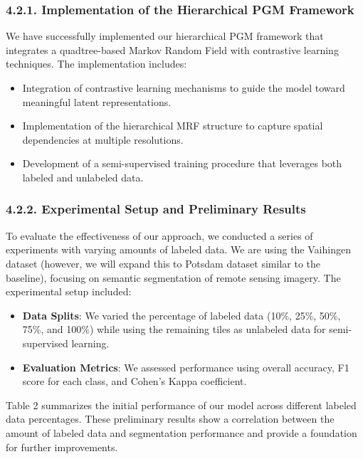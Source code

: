 \documentclass[conference]{IEEEtran}
\begin{document}
\subsubsection*{4.2.1. Implementation of the Hierarchical PGM Framework}

We have successfully implemented our hierarchical PGM framework that integrates a quadtree-based Markov Random Field with contrastive learning techniques. The implementation includes:

\begin{itemize}
    \item Integration of contrastive learning mechanisms to guide the model toward meaningful latent representations.
    \item Implementation of the hierarchical MRF structure to capture spatial dependencies at multiple resolutions.
    \item Development of a semi-supervised training procedure that leverages both labeled and unlabeled data.\\
\end{itemize}

\subsubsection*{4.2.2. Experimental Setup and Preliminary Results}

To evaluate the effectiveness of our approach, we conducted a series of experiments with varying amounts of labeled data. We are using the Vaihingen dataset (however, we will expand this to Potsdam dataset similar to the baseline), focusing on semantic segmentation of remote sensing imagery. The experimental setup included:

\begin{itemize}
    \item \textbf{Data Splits}: We varied the percentage of labeled data (10\%, 25\%, 50\%, 75\%, and 100\%) while using the remaining tiles as unlabeled data for semi-supervised learning.
    \item \textbf{Evaluation Metrics}: We assessed performance using overall accuracy, F1 score for each class, and Cohen's Kappa coefficient.
\end{itemize}

Table 2 summarizes the initial performance of our model across different labeled data percentages. These preliminary results show a correlation between the amount of labeled data and segmentation performance and provide a foundation for further improvements.
\end{document}
